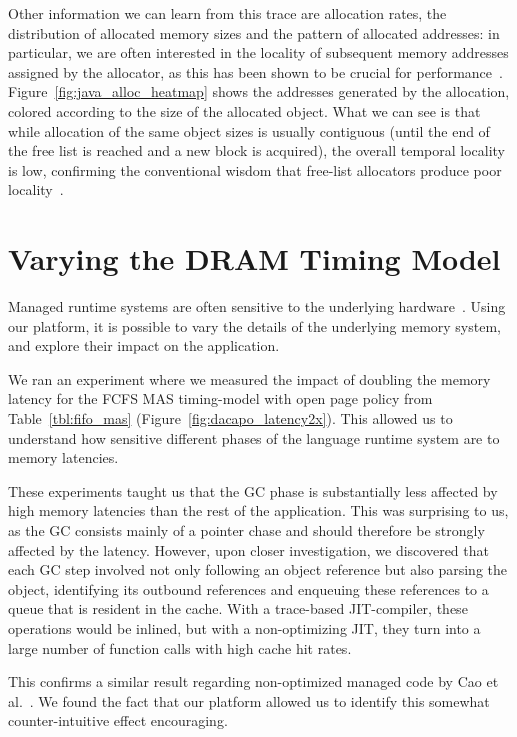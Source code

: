 Other information we can learn from this trace are allocation rates, the
distribution of allocated memory sizes and the pattern of allocated addresses:
in particular, we are often interested in the locality of subsequent memory
addresses assigned by the allocator, as this has been shown to be crucial for
performance~\cite{Blackburn:2004:OWH:998675.999420}.
Figure~\ref{fig:java_alloc_heatmap} shows the addresses generated by the
allocation, colored according to the size of the allocated object. What we can
see is that while allocation of the same object sizes is usually contiguous
(until the end of the free list is reached and a new block is acquired), the
overall temporal locality is low, confirming the conventional wisdom that
free-list allocators produce poor locality~\cite{Blackburn:2004:OWH:998675.999420}.

\section{Varying the DRAM Timing Model}

Managed runtime systems are often sensitive to the underlying
hardware~\cite{Cao:2012:YYP:2337159.2337185}. Using our platform, it is
possible to vary the details of the underlying memory system, and explore their
impact on the application.

We ran an experiment where we measured the impact of doubling the memory
latency for the FCFS MAS timing-model with open page policy from
Table~\ref{tbl:fifo_mas} (Figure~\ref{fig:dacapo_latency2x}). This allowed us
to understand how sensitive different phases of the language runtime system are
to memory latencies.

These experiments taught us that the GC phase is substantially less affected by
high memory latencies than the rest of the application. This was surprising to
us, as the GC consists mainly of a pointer chase and should therefore be
strongly affected by the latency. However, upon closer investigation, we
discovered that each GC step involved not only following an object reference
but also parsing the object, identifying its outbound references and enqueuing
these references to a queue that is resident in the cache. With a trace-based
JIT-compiler, these operations would be inlined, but with a non-optimizing JIT,
they turn into a large number of function calls with high cache hit rates.

This confirms a similar result regarding non-optimized managed code by Cao et
al.~\cite{Cao:2012:YYP:2337159.2337185}. We found the fact that our platform
allowed us to identify this somewhat counter-intuitive effect encouraging.

